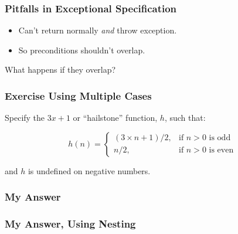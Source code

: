 \begin{frame}
\frametitle{Pitfalls in Exceptional Specification}
\begin{itemize}
\item
Can't return normally \emph{and\/} throw exception.

\item
So preconditions shouldn't overlap.
\end{itemize}

\begin{question}
What happens if they overlap?
\end{question}
\end{frame}

\begin{frame}
\frametitle{Exercise Using Multiple Cases}

\begin{exercise}
Specify the $3x+1$ or ``hailstone'' function, $h$,
such that:

\begin{displaymath}
h(n) = 
\left\{
\begin{array}{ll}
(3 \times n + 1)/2, & \mbox{if $n>0$ is odd} \\
n / 2,              & \mbox{if $n>0$ is even}
\end{array}
\right.
\end{displaymath}

and $h$ is undefined on negative numbers.
\end{exercise}
\end{frame}

\begin{frame}[fragile]
\frametitle{My Answer}

\end{frame}

\begin{frame}[fragile]
\frametitle{My Answer, Using Nesting}

\end{frame}


